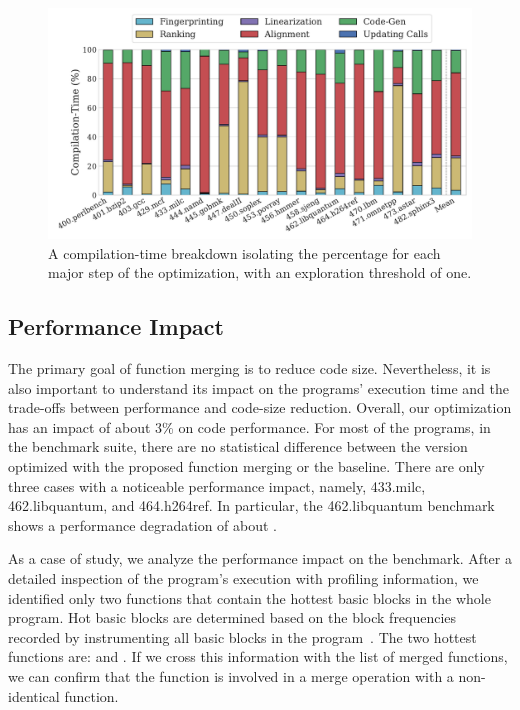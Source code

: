 \begin{figure}[th]
  \hspace{-2ex}
  \includegraphics[width=1.05\linewidth]{figs/compilation-time-breakdown-sqrd.pdf}
  \caption{A compilation-time breakdown isolating the percentage for each major
           step of the optimization, with an exploration threshold of one.}
  \label{fig:compilation-time-breakdown}
\end{figure}


\subsection{Performance Impact}


The primary goal of function merging is to reduce code size.
Nevertheless, it is also important to understand its impact on the programs'
execution time and the trade-offs between performance and code-size reduction.
Overall, our optimization has an impact of about 3\% on code performance.
For most of the programs, in the benchmark suite, there are no
statistical difference between the version optimized with the proposed function
merging or the baseline.
There are only three cases with a noticeable performance impact, namely,
433.milc, 462.libquantum, and 464.h264ref.
In particular, the 462.libquantum benchmark shows a performance degradation of
about .

As a case of study, we analyze the performance impact on the 
benchmark.
After a detailed inspection of the program's execution with profiling
information, we identified only two functions that contain the hottest basic
blocks in the whole program.
Hot basic blocks are determined based on the block frequencies recorded by
instrumenting all basic blocks in the program~\cite{ball94}.
The two hottest functions are:  and
.
If we cross this information with the list of merged functions, we can confirm
that the function  is involved in a merge operation with
a non-identical function.

